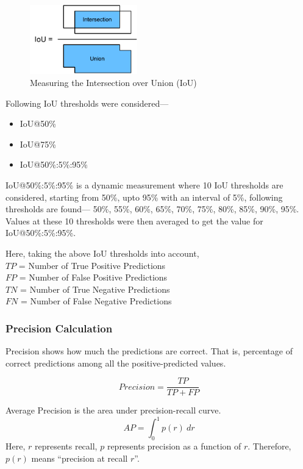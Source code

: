 \documentclass[conference]{IEEEtran}
\begin{document}
\begin{figure}[h]
  \centering
  \includegraphics[height=3cm]{img/IoU}
  \caption{Measuring the Intersection over Union (IoU)}
  \label{fig:iou}
\end{figure}
    
Following IoU thresholds were considered---
\begin{itemize}
  \item IoU@50\%
  \item IoU@75\%
  \item IoU@50\%:5\%:95\%
\end{itemize}
IoU@50\%:5\%:95\% is a dynamic measurement where 10 IoU thresholds are considered, starting from 50\%, upto 95\% with an interval of 5\%, following thresholds are found--- 50\%, 55\%, 60\%, 65\%, 70\%, 75\%, 80\%, 85\%, 90\%, 95\%. Values at these 10 thresholds were then averaged to get the value for IoU@50\%:5\%:95\%.
    
Here, taking the above IoU thresholds into account, \\
$TP$ = Number of True Positive Predictions \\
$FP$ = Number of False Positive Predictions \\
$TN$ = Number of True Negative Predictions \\
$FN$ = Number of False Negative Predictions\\
    
\subsubsection{Precision Calculation}
Precision shows how much the predictions are correct\cite{buckland1994relationship}. That is, percentage of correct predictions among all the positive-predicted values.  
    
\begin{equation}   
  Precision = \frac{TP}{TP+FP}    
\end{equation}
    
Average Precision is the area under precision-recall curve.
\begin{equation}
  AP = \int_{0}^{1}p(r) ~dr
\end{equation}
Here, $r$ represents recall, $p$ represents precision as a function of $r$. Therefore, $p(r)$ means ``precision at recall $r$''.
    
\end{document}
